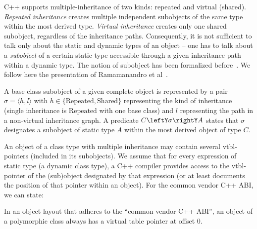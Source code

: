 C++ supports multiple-inheritance of two kinds: repeated and virtual (shared). 
\emph{Repeated inheritance} creates multiple independent subobjects of the same 
type within the most derived type. \emph{Virtual inheritance} creates only one 
shared subobject, regardless of the inheritance paths. Consequently,
it is not sufficient to talk only about the 
static and dynamic types of an object -- one has to talk about a 
\emph{subobject} of a certain static type accessible through a given inheritance 
path within a dynamic type. The notion of subobject has been formalized 
before~\cite{RF95,WNST06,RDL11}. We follow here the presentation of Ramamanandro 
et al~\cite{RDL11}.

A base class subobject of a given complete object is represented by a pair 
$\sigma = \langle h,l\rangle$ with $h \in \{\mathrm{Repeated},\mathrm{Shared}\}$ representing the 
kind of inheritance (single inheritance is $\mathrm{Repeated}$ with one base class) and $l$ 
representing the path in a non-virtual inheritance graph.
A predicate $C\leftY\sigma\rightY A$ states that $\sigma$ 
designates a subobject of static type $A$ within the most derived object of 
type $C$.

An object of a class
type with multiple inheritance may contain several vtbl-pointers
(included in its subobjects). We assume that for every expression of
static type  (a dynamic class type), a C++ compiler provides
access to the vtbl-pointer of the (sub)object designated by that 
expression (or at least documents the position of that
pointer within an object). For the common vendor C++ ABI, we can state:
\begin{lemma}
  In an object layout that adheres to the ``common vendor C++ ABI'', 
  an object of a polymorphic class always has a virtual table pointer
  at offset 0.
\label{lem:vtbl}
\end{lemma}

